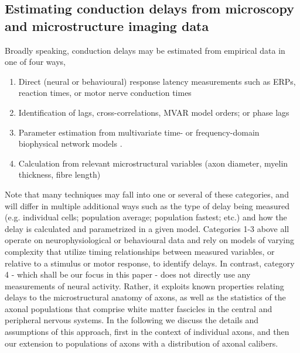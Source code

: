 
\subsection{Estimating conduction delays from microscopy and microstructure imaging data}


Broadly speaking, conduction delays may be estimated from empirical data in one of four ways, 
  
\begin{enumerate}
\item Direct (neural or behavioural) response latency measurements such as ERPs, reaction times, or motor nerve conduction times  \cite{reed1991arm,allison1984developmental, marzi1999the,lodhia2017decreased,wishart1995interhemispheric}
\item Identification of lags, cross-correlations, MVAR model orders; or phase lags \cite{cimponeriu2004estimation,brovelli2004beta}

\item Parameter estimation from multivariate time- or frequency-domain biophysical network models \cite{friston2011dcm, kerr2011modelbased}.

\item Calculation from relevant microstructural variables (axon diameter, myelin thickness, fibre length) \cite{caminiti2009evolution,caminiti2013diameter,ringo1994time}
\end{enumerate}

Note that many techniques may fall into one or several of these categories, and will differ in multiple additional ways such as the type of delay being measured (e.g. individual cells; population average; population fastest; etc.) and how the delay is calculated and parametrized in a given model. Categories 1-3 above all operate on neurophysiological or behavioural data and rely on models of varying complexity that utilize timing relationships between measured variables, or relative to a stimulus or motor response, to identify delays. In contrast, category 4 - which shall be our focus in this paper - does not directly use any measurements of neural activity. Rather, it exploits known properties relating delays to the microstructural anatomy of axons, as well as the statistics of the axonal populations that comprise white matter fascicles in the central and peripheral nervous systems. In the following we discuss the details and assumptions of this approach, first in the context of individual axons, and then our extension to populations of axons with a distribution of axonal calibers. 


